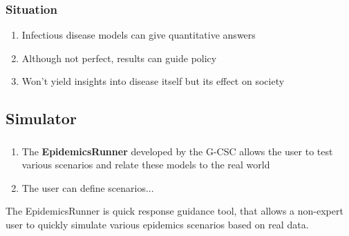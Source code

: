 \documentclass{beamer}
\begin{document}
\begin{frame}
	\frametitle{Situation}
	\begin{enumerate}[$\bullet$]
		\item Infectious disease models can give quantitative answers\\\vspace{0.1cm}
	         			
		\item Although not perfect, results can guide policy \\\vspace{0.1cm}
	       	
                \item Won't yield insights into disease itself but its effect on society	\\\vspace{0.1cm}
	\end{enumerate}
\end{frame}

\subsection{Simulator}
\begin{frame}
	\frametitle{}
	\begin{enumerate}[$\bullet$]
		\item The \textbf{EpidemicsRunner} developed by the G-CSC allows the user to test various scenarios and relate these models to the real world
	         			
		\item  The user can define scenarios...	\\\vspace{0.1cm}

	\end{enumerate}

\end{frame}


\begin{frame}
The EpidemicsRunner is quick response guidance tool, that allows a non-expert user to quickly
simulate various epidemics scenarios based on real data.

\end{frame}
\end{document}

